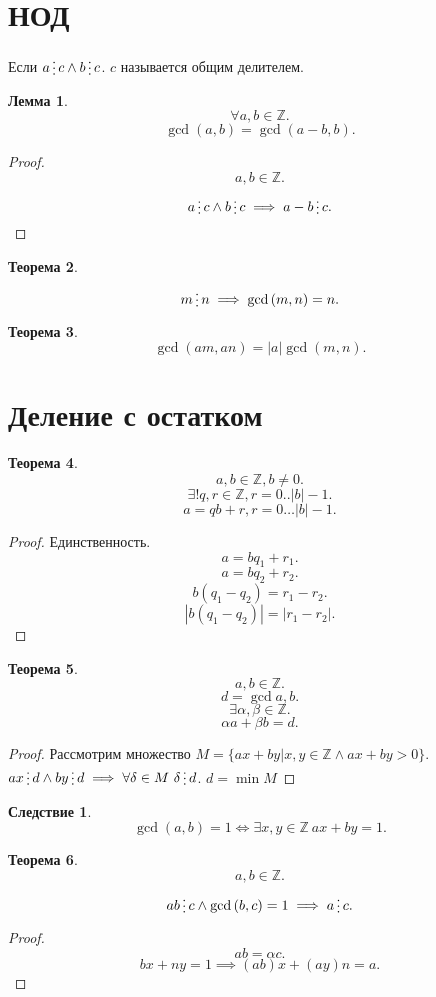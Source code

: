 \documentclass{scrarticle}
\newtheorem{theorem}{Теорема}
\newtheorem{corollary}{Следствие}[theorem]
\newtheorem{lemma}[theorem]{Лемма}
\newcommand{\divisible}{\mathop{\raisebox{-2pt}{\vdots}}}
\begin{document}
    \section{НОД}
    Если $a \divisible c \land b \divisible c$. $c$ называется общим делителем.
    \begin{lemma}
        \[
        \forall a , b \in \mathbb{Z}
        .\] 
        \[
            \gcd{( a,b )} = \gcd{( a-b,b )}
        .\] 
    \end{lemma}
    \begin{proof}
        \[
        a , b \in \mathbb{Z}
        .\] 
        \[
        a \divisible c \land b \divisible c \implies a - b \divisible c
        .\] 
    \end{proof}
    \begin{theorem}
        \[
            m \divisible n \implies \gcd{(m,n)} = n
        .\] 
    \end{theorem}
    \begin{theorem}
        \[
            \gcd{(am,an)} = |a| \gcd{( m,n )}
        .\] 
    \end{theorem}
    \section{Деление с остатком}
    \begin{theorem}
        \[
            a ,b \in \mathbb{Z}, b \neq 0
        .\] 
        \[
            \exists! q , r \in \mathbb{Z}, r = 0.. |b| - 1
        .\] 
        \[
            a = qb + r, r = 0\dots |b| -1
        .\] 
    \end{theorem}
    \begin{proof}
       Единственность.
       \[
       a = b q_1 + r_1
       .\] 
       \[
       a = b q_2 + r_2
       .\] 
       \[
           b(q_1 - q_2) = r_1 - r_2
       .\] 
       \[
       |b (q_1 - q_2) | = |r_1 - r_2|
       .\] 
    \end{proof}
    \begin{theorem}
        \[
        a , b \in \mathbb{Z}
        .\] 
        \[
            d = \gcd{a,b}
        .\] 
        \[
        \exists  \alpha , \beta \in \mathbb{Z}
        .\] 
        \[
        \alpha a + \beta b = d
        .\] 
    \end{theorem}
    \begin{proof}
        Рассмотрим множество $ M  = \{ax + by | x,y \in \mathbb{Z} \land ax + by > 0 \}$. $ax \divisible d \land by \divisible d \implies \forall \delta \in M ~ \delta \divisible d$. $d = \min{M}$
    \end{proof}
    \begin{corollary}
        \[
            \gcd{(a,b)} = 1 \iff \exists x,y \in \mathbb{Z} ~  ax + by = 1
        .\] 
    \end{corollary}
    \begin{theorem}
        \[
        a , b \in \mathbb{Z}
        .\] 
        \[
            ab \divisible c \land \gcd{(b,c)} = 1 \implies a \divisible c
        .\] 
    \end{theorem}
    \begin{proof}
        \[
        ab = \alpha c
        .\] 
        \[
        bx + ny = 1 \implies ( ab )x + (ay)n = a 
        .\] 
    \end{proof}
\end{document}
